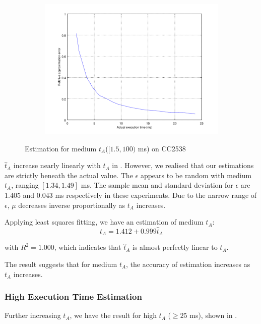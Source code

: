 \begin{figure}[ht!]
\begin{subfigure}{0.45\linewidth}
	\includegraphics[width=\linewidth]{fig/midrtvtaerr.png}
	\end{subfigure}
	\caption{Estimation for medium $t_A$($[1.5,100)$ ms) on CC2538}
	\label{Fig: Estimation for medium tA}
\end{figure}

$\hat{t}_A$ increase nearly linearly with $t_A$ in . However, we realised that our estimations are strictly beneath the actual value. The $\epsilon$ appears to be random with medium $t_A$,  ranging $[1.34, 1.49]$ ms.  The sample mean and standard deviation for $\epsilon$ are $1.405$ and $0.043$ ms respectively in these experiments. Due to the narrow range of $\epsilon$, $\mu$ decreases inverse proportionally as $t_A$ increases.

Applying least squares fitting, we have an estimation of medium $t_A$:
\begin{equation}
	t_A = 1.412 + 0.999\hat{t}_A 
\end{equation}

with $R^2=1.000$, which indicates that $\hat{t}_A$ is almost perfectly linear to $t_A$. 

The result suggests that for medium $t_A$, the accuracy of estimation increases as $t_A$ increases. 

\subsubsection{High Execution Time Estimation}

Further increasing $t_A$, we have the result for high $t_A$ ($\geq 25$ ms), shown in .

